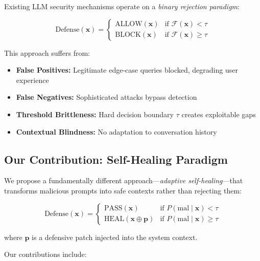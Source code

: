 \documentclass[11pt,twocolumn]{article}
\begin{document}
Existing LLM security mechanisms operate on a \textit{binary rejection paradigm}:

\begin{equation}
\text{Defense}(\mathbf{x}) = 
\begin{cases}
\text{ALLOW}(\mathbf{x}) & \text{if } \mathcal{F}(\mathbf{x}) < \tau \\
\text{BLOCK}(\mathbf{x}) & \text{if } \mathcal{F}(\mathbf{x}) \geq \tau
\end{cases}
\end{equation}

This approach suffers from:
\begin{itemize}[noitemsep]
    \item \textbf{False Positives:} Legitimate edge-case queries blocked, degrading user experience
    \item \textbf{False Negatives:} Sophisticated attacks bypass detection
    \item \textbf{Threshold Brittleness:} Hard decision boundary $\tau$ creates exploitable gaps
    \item \textbf{Contextual Blindness:} No adaptation to conversation history
\end{itemize}

\subsection{Our Contribution: Self-Healing Paradigm}

We propose a fundamentally different approach—\textit{adaptive self-healing}—that transforms malicious prompts into safe contexts rather than rejecting them:

\begin{equation}
\text{Defense}(\mathbf{x}) = 
\begin{cases}
\text{PASS}(\mathbf{x}) & \text{if } P(\text{mal} \mid \mathbf{x}) < \tau \\
\text{HEAL}(\mathbf{x} \oplus \mathbf{p}) & \text{if } P(\text{mal} \mid \mathbf{x}) \geq \tau
\end{cases}
\end{equation}

where $\mathbf{p}$ is a defensive patch injected into the system context.

Our contributions include:
\end{document}
